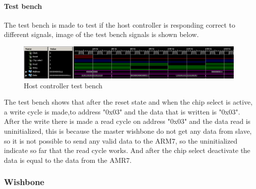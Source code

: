\paragraph{Test bench}
The test bench is made to test if the host controller is responding correct to different signals, image of the test bench signals is shown below.
\begin{figure}[H]
	\begin{centering}
		 \includegraphics[width=1.0\textwidth]{images/host_controller_tb.png}
		\caption{Host controller test bench}
	\end{centering}
\end{figure}
The test bench shows that after the reset state and when the chip select is active, a write cycle is made,to address "0x03" and the data that is written is "0x03". After the write there is made a read cycle on address "0x03" and the data read is uninitialized, this is because the master wishbone do not get any data from slave, so it is not possible to send any valid data to the ARM7, so the uninitialized indicate so far that the read cycle works. And after the chip select deactivate the data is equal to the data from the AMR7.
\subsubsection{Wishbone}

